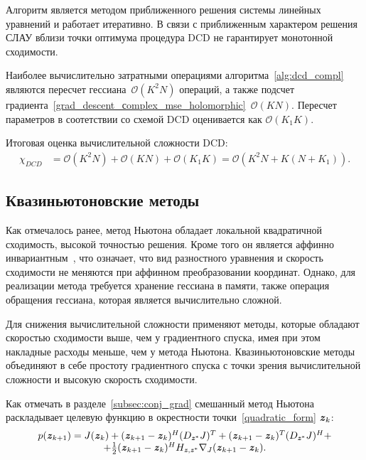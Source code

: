Алгоритм является методом приближенного решения системы линейных уравнений и работает итеративно. В связи с приближенным характером решения СЛАУ вблизи точки оптимума процедура DCD не гарантирует монотонной сходимости.

Наиболее вычислительно затратными операциями алгоритма~\ref{alg:dcd_compl} являются пересчет гессиана~$\mathcal{O}(K^2N)$ операций, а также подсчет градиента~\eqref{grad_descent_сomplex_mse_holomorphic}~$\mathcal{O}(KN)$. Пересчет параметров в соотетствии со схемой DCD оценивается как $\mathcal{O}(K_1K)$. 

Итоговая оценка вычислительной сложности DCD:
\begin{align}
	\chi_{DCD}&=\mathcal{O}(K^2N)+\mathcal{O}(KN)+\mathcal{O}(K_1K)=\mathcal{O}(K^2N+K(N+K_1)).
	\label{complexity_dcd}
\end{align}

\subsection{Квазиньютоновские методы} \label{subsec:quasi_newton}
Как отмечалось ранее, метод Ньютона обладает локальной квадратичной сходимость, высокой точностью решения. Кроме того он является аффинно инвариантным~\cite{nesterov}, что означает, что вид разностного уравнения и скорость сходимости не меняются при аффинном преобразовании координат. Однако, для реализации метода требуется хранение гессиана в памяти, также операция обращения гессиана, которая является вычислительно сложной. 

Для снижения вычислительной сложности применяют методы, которые обладают скоростью сходимости выше, чем у градиентного спуска, имея при этом накладные расходы меньше, чем у метода Ньютона. Квазиньютоновские методы объединяют в себе простоту градиентного спуска с точки зрения вычислительной сложности и высокую скорость сходимости. 

Как отмечать в разделе~\ref{subsec:conj_grad} смешанный метод Ньютона раскладывает целевую функцию в окрестности точки~\eqref{quadratic_form} $\textbf{\textit{z}}_{k}$:
\begin{equation}
	\begin{matrix}
		p(\textbf{\textit{z}}_{k+1})=
		J(\textbf{\textit{z}}_{k})+
		(\textbf{\textit{z}}_{k+1}-\textbf{\textit{z}}_{k})^H(D_{\textbf{\textit{z}}^*}J)^T+
		(\textbf{\textit{z}}_{k+1}-\textbf{\textit{z}}_{k})^T(D_{\textbf{\textit{z}}^*}J)^H+\\
		+\frac{1}{2}(\textbf{\textit{z}}_{k+1}-\textbf{\textit{z}}_{k})^H
		H_{\textbf{\textit{z}}, \textbf{\textit{z}}^*}\nabla_{J}
		(\textbf{\textit{z}}_{k+1}-\textbf{\textit{z}}_{k}).
		\label{approx_second_n}
	\end{matrix}
\end{equation}

